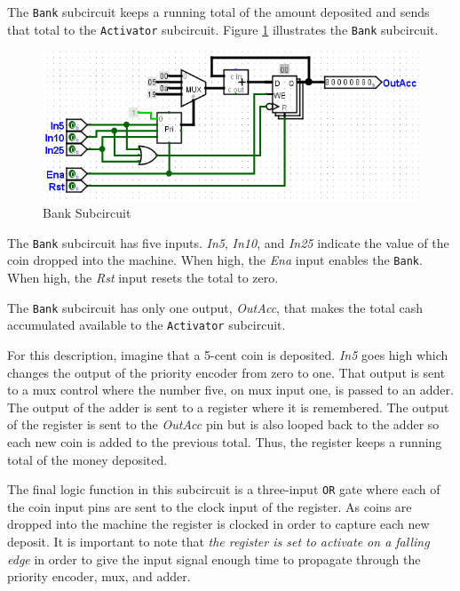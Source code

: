 The \lstinline[columns=fixed]|Bank| subcircuit keeps a running total of the amount deposited and sends that total to the \lstinline[columns=fixed]|Activator| subcircuit. Figure \ref{fig:vend-03} illustrates the \lstinline[columns=fixed]|Bank| subcircuit.

\begin{figure}[H]
	\centering
	\includegraphics[width=\maxwidth{.95\linewidth}]{gfx/vend-03}
	\caption{Bank Subcircuit}
	\label{fig:vend-03}
\end{figure}

The \lstinline[columns=fixed]|Bank| subcircuit has five inputs. \textit{In5}, \textit{In10}, and \textit{In25} indicate the value of the coin dropped into the machine. When high, the \textit{Ena} input enables the \lstinline[columns=fixed]|Bank|. When high, the \textit{Rst} input resets the total to zero.

The \lstinline[columns=fixed]|Bank| subcircuit has only one output, \textit{OutAcc}, that makes the total cash accumulated available to the \lstinline[columns=fixed]|Activator| subcircuit.

For this description, imagine that a 5-cent coin is deposited. \textit{In5} goes high which changes the output of the priority encoder from zero to one. That output is sent to a mux control where the number five, on mux input one, is passed to an adder. The output of the adder is sent to a register where it is remembered. The output of the register is sent to the \textit{OutAcc} pin but is also looped back to the adder so each new coin is added to the previous total. Thus, the register keeps a running total of the money deposited.

The final logic function in this subcircuit is a three-input \texttt{OR} gate where each of the coin input pins are sent to the clock input of the register. As coins are dropped into the machine the register is clocked in order to capture each new deposit. It is important to note that \textit{the register is set to activate on a falling edge} in order to give the input signal enough time to propagate through the priority encoder, mux, and adder.

